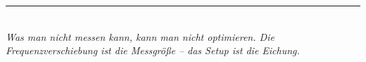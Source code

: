 \documentclass[11pt,a4paper]{article}
\begin{document}
\vspace{3mm}
\begin{center}
\textcolor{accentred}{\rule{0.6\textwidth}{1pt}}\\[4pt]
{\small\itshape Was man nicht messen kann, kann man nicht optimieren. Die Frequenzverschiebung ist die Messgröße -- das Setup ist die Eichung.}
\end{center}
\end{document}
